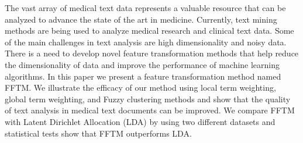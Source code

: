 The vast array of medical text data represents a valuable resource that can be analyzed to advance the state of the art in medicine. Currently, text mining methods are being used to analyze medical research and clinical text data. Some of the main challenges in text analysis are high dimensionality and noisy data. There is a need to develop novel feature transformation methods that help reduce the dimensionality of data and improve the performance of machine learning algorithms. In this paper we present a feature transformation method named FFTM. We illustrate the efficacy of our method using local term weighting, global term weighting, and Fuzzy clustering methods and show that the quality of text analysis in medical text documents can be improved. We compare FFTM with Latent Dirichlet Allocation (LDA) by using two different datasets and statistical tests show that FFTM outperforms LDA.
